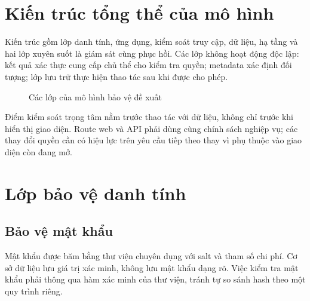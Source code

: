 \section{Kiến trúc tổng thể của mô hình}
Kiến trúc gồm lớp danh tính, ứng dụng, kiểm soát truy cập, dữ liệu, hạ tầng và hai lớp xuyên suốt là giám sát cùng phục hồi. Các lớp không hoạt động độc lập: kết quả xác thực cung cấp chủ thể cho kiểm tra quyền; metadata xác định đối tượng; lớp lưu trữ thực hiện thao tác sau khi được cho phép.
\begin{figure}[htbp]\centering
{}
\caption{Các lớp của mô hình bảo vệ đề xuất}
\end{figure}
Điểm kiểm soát trọng tâm nằm trước thao tác với dữ liệu, không chỉ trước khi hiển thị giao diện. Route web và API phải dùng cùng chính sách nghiệp vụ; các thay đổi quyền cần có hiệu lực trên yêu cầu tiếp theo thay vì phụ thuộc vào giao diện còn đang mở.

\section{Lớp bảo vệ danh tính}
\subsection{Bảo vệ mật khẩu}
Mật khẩu được băm bằng thư viện chuyên dụng với salt và tham số chi phí. Cơ sở dữ liệu lưu giá trị xác minh, không lưu mật khẩu dạng rõ. Việc kiểm tra mật khẩu phải thông qua hàm xác minh của thư viện, tránh tự so sánh hash theo một quy trình riêng.

